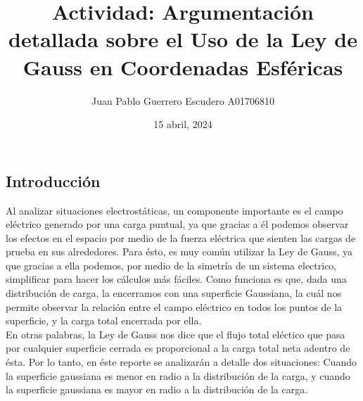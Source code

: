 \documentclass[12pt, letterpaper]{report}
\title{Actividad: Argumentación detallada sobre el Uso de la Ley de Gauss en Coordenadas Esféricas}
\author{Juan Pablo Guerrero Escudero A01706810}
\date{15 abril, 2024}
\begin{document}
\maketitle
\subsection*{Introducción}
Al analizar situaciones electrostáticas, un componente importante es el campo eléctrico generado por una carga puntual, ya que 
gracias a él podemos observar los efectos en el espacio por medio de la fuerza eléctrica que sienten las cargas de prueba en sus alrededores. Para ésto, es muy común 
utilizar la Ley de Gauss, ya que gracias a ella podemos, por medio de la simetría de un sistema electrico, simplificar 
para hacer los cálculos más fáciles. Como funciona es que, dada una distribución de carga, la encerramos con una superficie 
Gaussiana, la cuál nos permite observar la relación entre el campo eléctrico en todos los puntos de la superficie, y la carga total encerrada por ella. \\
En otras palabras, la Ley de Gauss nos dice que el flujo total eléctico que pasa por cualquier superficie cerrada es proporcional a la carga total neta adentro de 
ésta. Por lo tanto, en éste reporte se analizarán a detalle dos situaciones: Cuando la superficie gaussiana es menor en radio a la distribución de la carga, y cuando la 
superficie gaussiana es mayor en radio a la distribución de la carga. 
\end{document}
